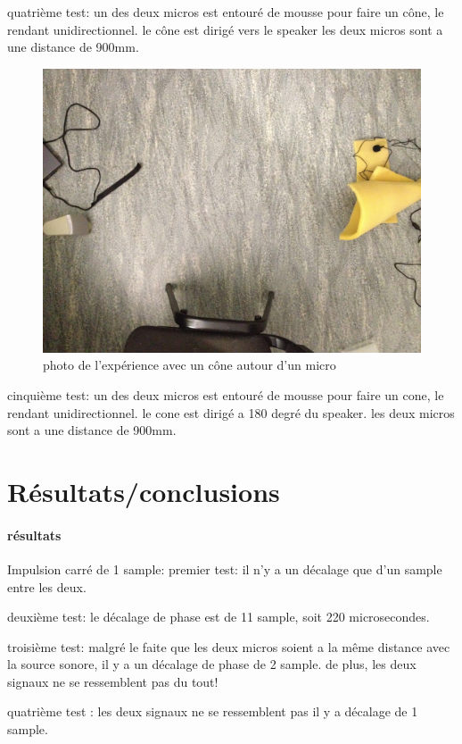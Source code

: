 \documentclass[12pt,a4paper]{article}
\begin{document}
	quatrième test:
		un des deux micros est entouré de mousse pour faire un cône, le rendant unidirectionnel.
		le cône est dirigé vers le speaker
		les deux micros sont a une distance de 900mm.
\begin{figure}[H]
		\includegraphics[width=\textwidth]{../donnees11-03/test_4.jpg} 
		\caption{photo de l'expérience avec un cône autour d'un micro}
\end{figure}
	cinquième test:
		un des deux micros est entouré de mousse pour faire un cone, le rendant unidirectionnel.
		le cone est dirigé a 180 degré du speaker.
		les deux micros sont a une distance de 900mm.


\section{Résultats/conclusions}
\paragraph{résultats}
	Impulsion carré de 1 sample:
		premier test:
			il n'y a un décalage que d'un sample entre les deux.

		deuxième test:
			le décalage de phase est de 11 sample, soit 220 microsecondes.

		troisième test:
			malgré le faite que les deux micros soient a la même distance avec la source sonore, il y a un décalage de phase de 2 sample. de plus, les deux signaux ne se ressemblent pas du tout!

		quatrième test :
			les deux signaux ne se ressemblent pas
			il y a décalage de 1 sample.
\end{document}
